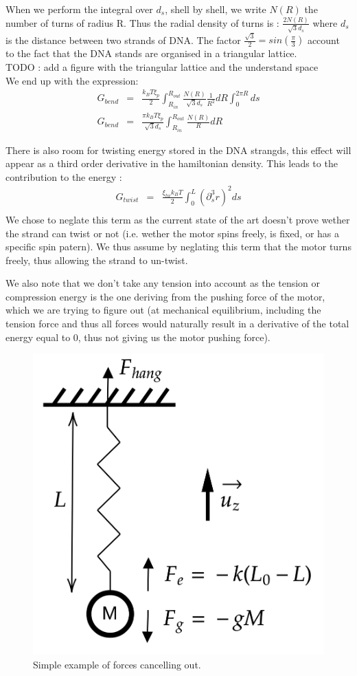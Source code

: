 \documentclass{article}
\begin{document}
When we perform the integral over $d_s$, shell by shell, we write $N(R)$ the number of turns of radius R. Thus the radial density of turns is : $\frac{2N(R)}{\sqrt{3} d_s}$ where $d_s$ is the distance between two strands of DNA. The factor $\frac{\sqrt{3}}{2} = sin \left( \frac{\pi}{3} \right)$ account to the fact that the DNA stands are organised in a triangular lattice.
\\
TODO : add a figure with the triangular lattice and the understand space
\\
We end up with the expression:
\begin{eqnarray}
    G_{bend} & = & \frac{k_B T \xi_p}{2} \int_{R_{in}}^{R_{out}} \frac{N(R)}{\sqrt{3} d_s} \frac{1}{R^2} dR \int_{0}^{2\pi R} ds \\
    G_{bend} & = & \frac{ \pi k_B T \xi_p}{\sqrt{3} d_s} \int_{R_{in}}^{R_{out}} \frac{N(R)}{R} dR
\end{eqnarray}

There is also room for twisting energy stored in the DNA strangds, this effect will appear as a third order derivative in the hamiltonian density. This leads to the contribution to the energy :
\begin{eqnarray}
    G_{twist} &=& \frac{\xi_{tw} k_B T}{2} \int_{0}^{L} \left( \partial_s^3 r \right)^2 ds \\
\end{eqnarray}
We chose to neglate this term as the current state of the art doesn't prove wether the strand can twist or not (i.e. wether the motor spins freely, is fixed, or has a specific spin patern). We thus assume by neglating this term that the motor turns freely, thus allowing the strand to un-twist.

We also note that we don't take any tension into account as the tension or compression energy is the one deriving from the pushing force of the motor, which we are trying to figure out (at mechanical equilibrium, including the tension force and thus all forces would naturally result in a derivative of the total energy equal to 0, thus not giving us the motor pushing force).

\begin{figure}[H]
    \centering
    \includegraphics[height=0.3\textwidth]{schema_equilibre.png}
    \caption{Simple example of forces cancelling out.}
    \label{fig:force}
\end{figure}
\end{document}
